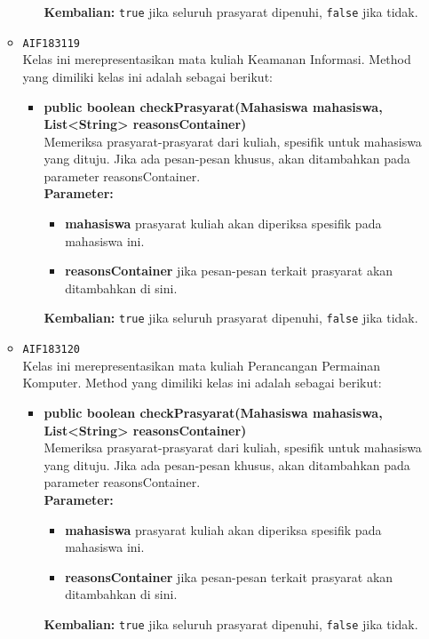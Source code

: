 \begin{enumerate}
\begin{itemize}
\begin{itemize}
\begin{itemize}
\end{itemize}
\textbf{Kembalian:} \texttt{true} jika seluruh prasyarat dipenuhi, \texttt{false} jika tidak.
\end{itemize}
\item \texttt{AIF183119} \\
Kelas ini merepresentasikan mata kuliah Keamanan Informasi. Method yang dimiliki kelas ini adalah sebagai berikut: 
\begin{itemize}
\item \textbf{public boolean checkPrasyarat(Mahasiswa mahasiswa, List<String> reasonsContainer)}\\
Memeriksa prasyarat-prasyarat dari kuliah, spesifik untuk mahasiswa yang dituju. Jika ada pesan-pesan khusus, akan ditambahkan pada parameter reasonsContainer.\\
\textbf{Parameter:}
\begin{itemize}
\item \textbf{mahasiswa} prasyarat kuliah akan diperiksa spesifik pada mahasiswa ini.
\item \textbf{reasonsContainer} jika pesan-pesan terkait prasyarat akan ditambahkan di sini.
\end{itemize}
\textbf{Kembalian:} \texttt{true} jika seluruh prasyarat dipenuhi, \texttt{false} jika tidak.
\end{itemize}
\item \texttt{AIF183120} \\
Kelas ini merepresentasikan mata kuliah Perancangan Permainan Komputer. Method yang dimiliki kelas ini adalah sebagai berikut: 
\begin{itemize}
\item \textbf{public boolean checkPrasyarat(Mahasiswa mahasiswa, List<String> reasonsContainer)}\\
Memeriksa prasyarat-prasyarat dari kuliah, spesifik untuk mahasiswa yang dituju. Jika ada pesan-pesan khusus, akan ditambahkan pada parameter reasonsContainer.\\
\textbf{Parameter:}
\begin{itemize}
\item \textbf{mahasiswa} prasyarat kuliah akan diperiksa spesifik pada mahasiswa ini.
\item \textbf{reasonsContainer} jika pesan-pesan terkait prasyarat akan ditambahkan di sini.
\end{itemize}
\textbf{Kembalian:} \texttt{true} jika seluruh prasyarat dipenuhi, \texttt{false} jika tidak.
\end{itemize}

\end{itemize}
\end{enumerate}
